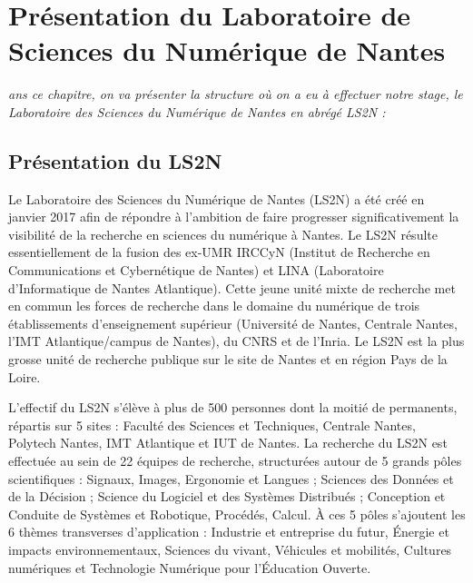 \let\textcircled=\pgftextcircled
\chapter{Pr\'esentation du Laboratoire de Sciences du Numérique de Nantes}
\label{chap:structure}

\textit{ans ce chapitre, on va présenter la structure où on a eu à effectuer notre stage, le Laboratoire des Sciences du Numérique de Nantes en abrégé LS2N : }

\minitoc

\newpage    

\section{Présentation du LS2N}
Le Laboratoire des Sciences du Numérique de Nantes (LS2N) a été créé en janvier 2017 afin de répondre à l’ambition de faire progresser significativement la visibilité de la recherche en sciences du numérique à Nantes. Le LS2N résulte essentiellement de la fusion des ex-UMR IRCCyN (Institut de Recherche en Communications et Cybernétique de Nantes) et LINA (Laboratoire d’Informatique de Nantes Atlantique). Cette jeune unité mixte de recherche met en commun les forces de recherche dans le domaine du numérique de trois établissements d’enseignement supérieur (Université de Nantes, Centrale Nantes, l’IMT Atlantique/campus de Nantes), du CNRS et de l’Inria. Le LS2N est la plus grosse unité de recherche publique sur le site de Nantes et en région Pays de la Loire.

L’effectif du LS2N s’élève à plus de 500 personnes dont la moitié de permanents, répartis sur 5 sites : Faculté des Sciences et Techniques, Centrale Nantes, Polytech Nantes, IMT Atlantique et IUT de Nantes. La recherche du LS2N est effectuée au sein de 22 équipes de recherche, structurées autour de 5 grands pôles scientifiques : Signaux, Images, Ergonomie et Langues ; Sciences des Données et de la Décision ; Science du Logiciel et des Systèmes Distribués ; Conception et Conduite de Systèmes et Robotique, Procédés, Calcul. À ces 5 pôles s’ajoutent les 6 thèmes transverses d’application : Industrie et entreprise du futur, Énergie et impacts environnementaux, Sciences du vivant, Véhicules et mobilités, Cultures numériques et Technologie Numérique pour l’Éducation Ouverte.

